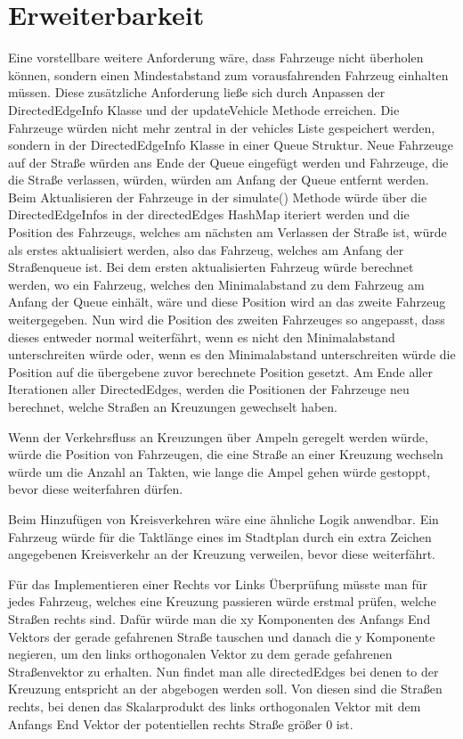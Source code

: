 \chapter{Erweiterbarkeit}

Eine vorstellbare weitere Anforderung wäre, 
dass Fahrzeuge nicht überholen können, sondern einen Mindestabstand zum vorausfahrenden Fahrzeug einhalten müssen.
Diese zusätzliche Anforderung ließe sich durch Anpassen der DirectedEdgeInfo Klasse und der updateVehicle Methode erreichen.
Die Fahrzeuge würden nicht mehr zentral in der vehicles Liste gespeichert werden, sondern in der DirectedEdgeInfo Klasse in einer
Queue Struktur. Neue Fahrzeuge auf der Straße würden ans Ende der Queue eingefügt werden und Fahrzeuge, die die Straße verlassen, 
würden, würden am Anfang der Queue entfernt werden.
Beim Aktualisieren der Fahrzeuge in der simulate() Methode würde über die DirectedEdgeInfos in der directedEdges HashMap iteriert werden
und die Position des Fahrzeugs, welches am nächsten am Verlassen der Straße ist, würde als erstes aktualisiert werden, also das Fahrzeug, welches am Anfang der 
Straßenqueue ist. Bei dem ersten aktualisierten Fahrzeug würde berechnet werden, wo ein Fahrzeug, welches den Minimalabstand zu dem Fahrzeug am Anfang der Queue einhält, wäre und diese Position wird an
das zweite Fahrzeug weitergegeben. Nun wird die Position des zweiten Fahrzeuges so angepasst, dass dieses entweder normal weiterfährt, wenn es nicht den Minimalabstand unterschreiten würde oder,
wenn es den Minimalabstand unterschreiten würde die Position auf die übergebene zuvor berechnete Position gesetzt.
Am Ende aller Iterationen aller DirectedEdges, werden die Positionen der Fahrzeuge neu berechnet, welche Straßen an Kreuzungen gewechselt haben.

Wenn der Verkehrsfluss an Kreuzungen über Ampeln geregelt werden würde, würde die Position von Fahrzeugen,
die eine Straße an einer Kreuzung wechseln würde um die Anzahl an Takten, wie lange die Ampel gehen würde gestoppt, bevor diese weiterfahren dürfen.

Beim Hinzufügen von Kreisverkehren wäre eine ähnliche Logik anwendbar. Ein Fahrzeug würde für die Taktlänge eines im Stadtplan durch ein extra Zeichen angegebenen Kreisverkehr
an der Kreuzung verweilen, bevor diese weiterfährt.

Für das Implementieren einer Rechts vor Links Überprüfung müsste man für jedes Fahrzeug, welches eine Kreuzung passieren würde erstmal prüfen,
welche Straßen rechts sind. Dafür würde man die xy Komponenten des Anfangs End Vektors der gerade gefahrenen Straße tauschen und danach die y Komponente negieren,
um den links orthogonalen Vektor zu dem gerade gefahrenen Straßenvektor zu erhalten. Nun findet man alle directedEdges bei denen to der Kreuzung entspricht an der abgebogen werden soll.
Von diesen sind die Straßen rechts, bei denen das Skalarprodukt des links orthogonalen Vektor mit dem Anfangs End Vektor der potentiellen rechts Straße größer 0 ist.

